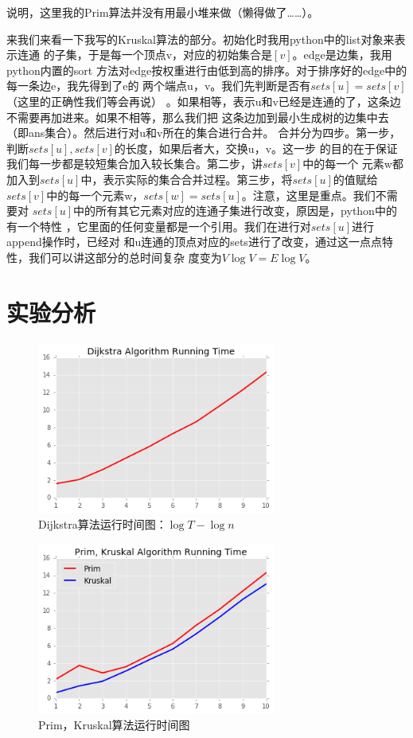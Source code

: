 \documentclass[12pt]{article}
\begin{document}
说明，这里我的Prim算法并没有用最小堆来做（懒得做了……）。

\medskip

来我们来看一下我写的Kruskal算法的部分。初始化时我用python中的list对象来表示连通
的子集，于是每一个顶点v，对应的初始集合是$[v]$。edge是边集，我用python内置的sort
方法对edge按权重进行由低到高的排序。对于排序好的edge中的每一条边e，我先得到了e的
两个端点u，v。我们先判断是否有$sets[u] = sets[v]$（这里的正确性我们等会再说）
。如果相等，表示u和v已经是连通的了，这条边不需要再加进来。如果不相等，那么我们把
这条边加到最小生成树的边集中去（即ans集合）。然后进行对u和v所在的集合进行合并。
合并分为四步。第一步，判断$sets[u],sets[v]$的长度，如果后者大，交换u，v。这一步
的目的在于保证我们每一步都是较短集合加入较长集合。第二步，讲$sets[v]$中的每一个
元素w都加入到$sets[u]$中，表示实际的集合合并过程。第三步，将$sets[u]$的值赋给
$sets[v]$中的每一个元素w，$sets[w]=sets[u]$。注意，这里是重点。我们不需要对
$sets[u]$中的所有其它元素对应的连通子集进行改变，原因是，python中的有一个特性
，它里面的任何变量都是一个引用。我们在进行对$sets[u]$进行append操作时，已经对
和u连通的顶点对应的sets进行了改变，通过这一点点特性，我们可以讲这部分的总时间复杂
度变为$V\log{V}=E\log{V}$。

\section*{实验分析}

\begin{figure}[H]
    \centering
    \includegraphics[width=0.70\textwidth]{dijkstra.png}
    \caption{Dijkstra算法运行时间图：$ \log{T}-\log{n} $}
\end{figure}

\begin{figure}[H]
    \centering
    \includegraphics[width=0.70\textwidth]{mst.png}
    \caption{Prim，Kruskal算法运行时间图}
\end{figure}
\end{document}
